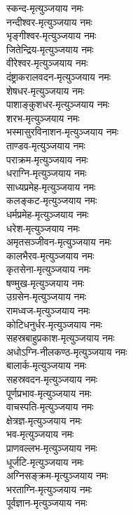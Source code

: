 \begin{multicols}{2}
\begin{flushleft}
स्कन्द-मृत्युञ्जयाय नमः\\
नन्दीश्वर-मृत्युञ्जयाय नमः\hfill{}\\
भृङ्गीश्वर-मृत्युञ्जयाय नमः\\
जितेन्द्रिय-मृत्युञ्जयाय नमः\\
वीरेश्वर-मृत्युञ्जयाय नमः\\
दंष्ट्राकरालवदन-मृत्युञ्जयाय नमः\\
शेषधर-मृत्युञ्जयाय नमः\\
पाशाङ्कुशधर-मृत्युञ्जयाय नमः\\
शरभ-मृत्युञ्जयाय नमः\\
भस्मासुरविनाशन-मृत्युञ्जयाय नमः\\
ताण्डव-मृत्युञ्जयाय नमः\\
पराक्रम-मृत्युञ्जयाय नमः\hfill{}\\
धराग्नि-मृत्युञ्जयाय नमः\\
साध्यप्रमेह-मृत्युञ्जयाय नमः\\
कलङ्कट-मृत्युञ्जयाय नमः\\
धर्मप्रमेह-मृत्युञ्जयाय नमः\\
धरेश-मृत्युञ्जयाय नमः\\
अमृतसञ्जीवन-मृत्युञ्जयाय नमः\\
कालभैरव-मृत्युञ्जयाय नमः\\
कृतसेना-मृत्युञ्जयाय नमः\\
षण्मुख-मृत्युञ्जयाय नमः\\
उग्रसेन-मृत्युञ्जयाय नमः\hfill{}\\
रामध्वज-मृत्युञ्जयाय नमः\\
कोटिधनुर्धर-मृत्युञ्जयाय नमः\\
सहस्रबाहुप्रकाश-मृत्युञ्जयाय नमः\\
अधोऽग्नि-नीलकण्ठ-मृत्युञ्जयाय नमः\\
बालार्क-मृत्युञ्जयाय नमः\\
सहस्रवदन-मृत्युञ्जयाय नमः\\
पूर्णप्रभाव-मृत्युञ्जयाय नमः\\
वाचस्पति-मृत्युञ्जयाय नमः\\
क्षेत्रज्ञ-मृत्युञ्जयाय नमः\\
भव-मृत्युञ्जयाय नमः\hfill{}\\
प्राणवल्लभ-मृत्युञ्जयाय नमः\\
धूर्जटि-मृत्युञ्जयाय नमः\\
अग्निसङ्क्रम-मृत्युञ्जयाय नमः\\
भरताग्नि-मृत्युञ्जयाय नमः\\
पूर्वज्ञान-मृत्युञ्जयाय नमः\\

\end{flushleft}
\end{multicols}
